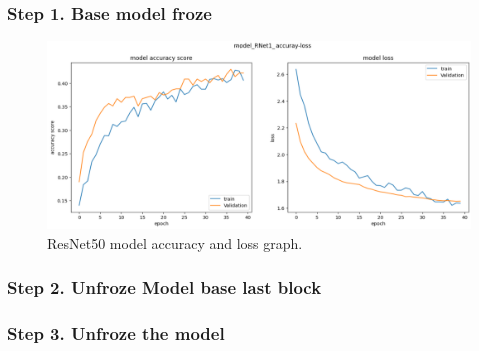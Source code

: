 \subsubsection{Step 1. Base model froze}

\begin{figure}[ht]
    \begin{center}
        \includegraphics[scale=0.45]{images/Building/Model RestNet50/ResNet50 model accuray_loss.png}
        \caption{ResNet50 model accuracy and loss graph.}
    \label{fig: ResNet50_accuracy_loss}    
    \end{center}
\end{figure}

\subsubsection{Step 2. Unfroze Model base last block}

\subsubsection{Step 3. Unfroze the model}



